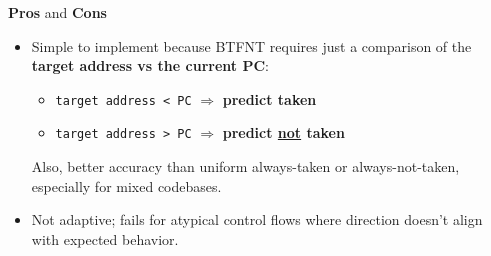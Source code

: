 \highspace
\begin{flushleft}
    \textcolor{Green3}{ \textbf{Pros}} and \textcolor{Red2}{ \textbf{Cons}}
\end{flushleft}
\begin{itemize}
    \item[\textcolor{Green3}{\faIcon{check}}] Simple to implement because BTFNT requires just a comparison of the \textbf{target address vs the current PC}:
    \begin{itemize}
        \item \texttt{target address < PC} $\Rightarrow$ \textbf{predict taken}
        \item \texttt{target address > PC} $\Rightarrow$ \textbf{predict \underline{not} taken}
    \end{itemize}
    Also, better accuracy than uniform always-taken or always-not-taken, especially for mixed codebases.

    \item[\textcolor{Red2}{\faIcon{times}}] Not adaptive; fails for atypical control flows where direction doesn't align with expected behavior.
\end{itemize}
